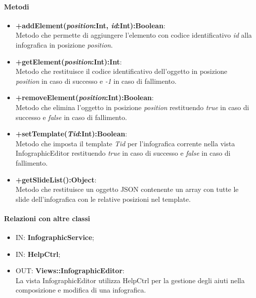 	\paragraph{Metodi}
	\begin{itemize}
	  \item \textbf{+addElement(\textit{position}:Int, \textit{id}:Int):Boolean}:\\
		  Metodo che permette di aggiungere l'elemento con codice identificativo \textit{id} alla infografica in posizione \textit{position}.
	  \item \textbf{+getElement(\textit{position}:Int):Int}:\\
		  Metodo che restituisce il codice identificativo dell'oggetto in posizione \textit{position} in caso di successo e \textit{-1} in caso di fallimento.
	  \item \textbf{+removeElement(\textit{position}:Int):Boolean}:\\
		  Metodo che elimina l'oggetto in posizione \textit{position} restituendo \textit{true} in caso di successo e \textit{false} in caso di fallimento.
	  \item \textbf{+setTemplate(\textit{Tid}:Int):Boolean}:\\
		  Metodo che imposta il template \textit{Tid} per l'infografica corrente nella vista InfographicEditor restituendo \textit{true} in caso di successo e \textit{false} in caso di fallimento.
	  \item \textbf{+getSlideList():Object}:\\
		  Metodo che restituisce un oggetto JSON contenente un array con tutte le slide dell'infografica con le relative posizioni nel template.
		  
	\end{itemize}
	\paragraph{Relazioni con altre classi}
	\begin{itemize}
		\item IN: \textbf{InfographicService};
		\item IN: \textbf{HelpCtrl};
		\item OUT: \textbf{Views::InfographicEditor}:\\
			La vista InfographicEditor utilizza HelpCtrl per la gestione degli aiuti nella composizione e modifica di una infografica. 	
	\end{itemize}
	
